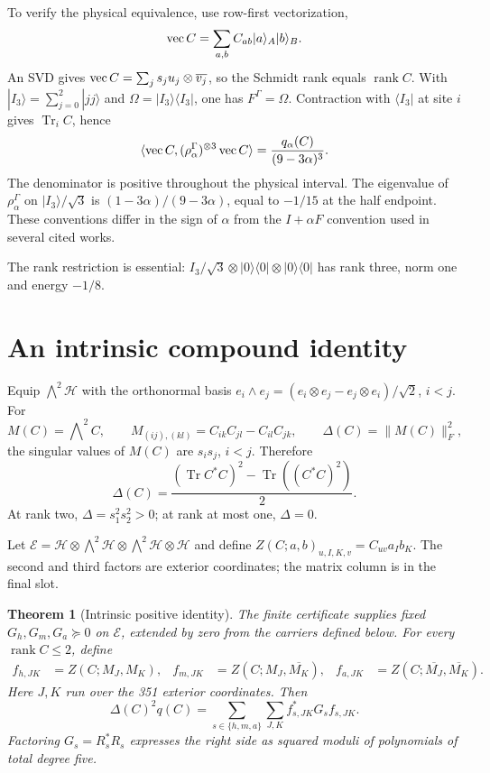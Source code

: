 \documentclass[11pt,a4paper]{article}
\newtheorem{theorem}{Theorem}
\theoremstyle{definition}\newtheorem{definition}[theorem]{Definition}
\theoremstyle{remark}\newtheorem{remark}[theorem]{Remark}
\DeclareMathOperator{\Tr}{Tr}\DeclareMathOperator{\rank}{rank}
\newcommand{\HH}{\mathcal H}\newcommand{\LL}{\mathcal L}
\newcommand{\nf}[1]{\lVert#1\rVert_F}
\newcommand{\ip}[2]{\langle#1,#2\rangle}
\newcommand{\ket}[1]{|#1\rangle}\newcommand{\bra}[1]{\langle#1|}
\numberwithin{equation}{section}
\begin{document}
To verify the physical equivalence, use row-first vectorization,
\[
\vecop C=\sum_{a,b}C_{ab}\ket a_A\ket b_B.
\]
An SVD gives $\operatorname{vec} C=\sum_j s_ju_j\otimes\overline{v_j}$, so
the Schmidt rank equals $\rank C$. With
$\ket{I_3}=\sum_{j=0}^2\ket{jj}$ and
$\Omega=\ket{I_3}\bra{I_3}$, one has $F^\Gamma=\Omega$.
Contraction with $\bra{I_3}$ at site $i$ gives $\Tr_iC$, hence
\begin{equation}
\ip{\vecop C}{(\rho_\alpha^\Gamma)^{\otimes3}\vecop C}
=\frac{q_\alpha(C)}{(9-3\alpha)^3}.
\label{eq:physical}
\end{equation}
The denominator is positive throughout the physical interval.
The eigenvalue of $\rho_\alpha^\Gamma$ on $\ket{I_3}/\sqrt3$ is
$(1-3\alpha)/(9-3\alpha)$, equal to $-1/15$ at the half endpoint.
These conventions differ in the sign of $\alpha$ from the
$I+\alpha F$ convention used in several cited works.

The rank restriction is essential:
$I_3/\sqrt3\otimes\ket0\bra0\otimes\ket0\bra0$ has rank three,
norm one and energy $-1/8$.

\section{An intrinsic compound identity}\label{sec:intrinsic}
Equip $\bigwedge^2\HH$ with the orthonormal basis
$e_i\wedge e_j=(e_i\otimes e_j-e_j\otimes e_i)/\sqrt2$, $i<j$.
For
\begin{equation}
M(C)=\bigwedge\nolimits^2C,\qquad
M_{(ij),(kl)}=C_{ik}C_{jl}-C_{il}C_{jk},\qquad
\Delta(C)=\nf{M(C)}^2,
\label{eq:compound}
\end{equation}
the singular values of $M(C)$ are $s_is_j$, $i<j$. Therefore
\begin{equation}
\Delta(C)=\frac{(\Tr C^*C)^2-\Tr((C^*C)^2)}2.
\label{eq:delta}
\end{equation}
At rank two, $\Delta=s_1^2s_2^2>0$; at rank at most one, $\Delta=0$.

Let $\mathcal E=\HH\otimes\bigwedge^2\HH\otimes
\bigwedge^2\HH\otimes\HH$ and define
$Z(C;a,b)_{u,I,K,v}=C_{uv}a_Ib_K$.
The second and third factors are exterior coordinates; the matrix
column is in the final slot.

\begin{theorem}[Intrinsic positive identity]\label{thm:intrinsic}
The finite certificate supplies fixed $G_h,G_m,G_a\succeq0$ on
$\mathcal E$, extended by zero from the carriers defined below.
For every $\rank C\le2$, define
\begin{align}
f_{h,JK}&=Z(C;M_J,M_K),&
f_{m,JK}&=Z(C;M_J,\overline{M_K}),&
f_{a,JK}&=Z(C;\overline{M_J},\overline{M_K}).
\label{eq:f}
\end{align}
Here $J,K$ run over the 351 exterior coordinates.
Then
\begin{equation}
\Delta(C)^2q(C)=\sum_{s\in\{h,m,a\}}\sum_{J,K}
                 f_{s,JK}^*G_sf_{s,JK}.
\label{eq:intrinsic}
\end{equation}
Factoring $G_s=R_s^*R_s$ expresses the right side as squared
moduli of polynomials of total degree five.
\end{theorem}
\end{document}
